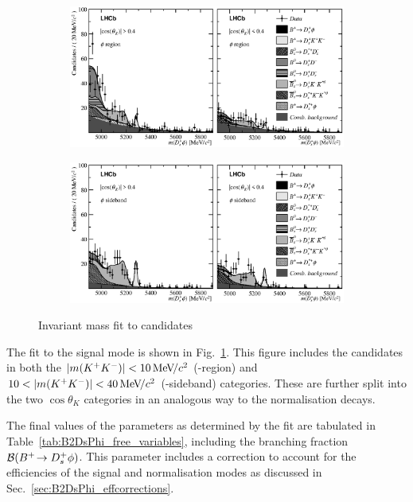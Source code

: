 \begin{figure}[!h]
    \centering
    \begin{subfigure}[t]{1.0\textwidth}
        \includegraphics[width=1.0\textwidth]{figs/B2DsPhi/Fig4a.eps}
    \end{subfigure}
    \begin{subfigure}[t]{1.0\textwidth}
        \includegraphics[width=1.0\textwidth]{figs/B2DsPhi/Fig4b.eps}
    \end{subfigure}
    \caption{Invariant mass fit to \decay{\Bp}{\Dsp\phiz} candidates}
    \label{fig:B2DsPhi_Signal_Fit}
\end{figure}

The fit to the signal mode is shown in Fig.~\ref{fig:B2DsPhi_Signal_Fit}. This figure includes the \decay{\Bp}{\Dsp\phiz} candidates in both the $|m({{K}^+}{{K}^-})| < 10{\mathrm{\,Me\kern -0.1em V\!/}c^2}$ (\phiz-region) and $10< |m({{K}^+}{{K}^-})| < 40{\mathrm{\,Me\kern -0.1em V\!/}c^2}$ (\phiz-sideband) categories. These are further split into the two $\cos\theta_{K}$ categories in an analogous way to the normalisation decays.



The final values of the parameters as determined by the fit are tabulated in Table~\ref{tab:B2DsPhi_free_variables}, including the branching fraction ${\mathcal{B}}({{{B}^+}}\!\rightarrow {\ensuremath{{D}^+_{s}}}\phi)$. This parameter includes a correction to account for the efficiencies of the signal and normalisation modes as discussed in Sec.~\ref{sec:B2DsPhi_effcorrections}. 

